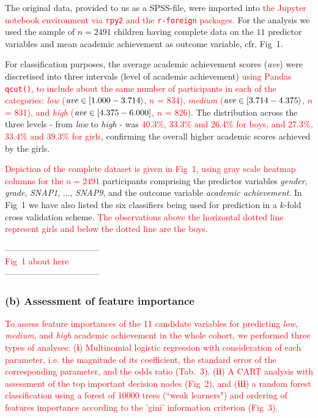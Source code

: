 \documentclass[10pt,letterpaper]{article}
\begin{document}
The original data, provided to us as a SPSS-file, were imported into \textcolor{red}{the Jupyter notebook environment via {\tt rpy2} and the {\tt r-foreign} packages.} 
For the analysis we used the sample of  $n=2491$ children having complete data 
on the $11$ predictor variables and mean academic achievement as outcome variable, cfr. Fig~1.

 For classification purposes, the average academic achievement scores (\emph{ave}) were discretised into three intervals (level of academic achievement) 
 \textcolor{red}{using Pandas {\tt qcut()}, to include about the same number of participants in each of the categories:  
{\it low} (${\text{\it ave}} \in [1.000 - 3.714\rangle$,  $n$ = 834),
{\it medium} (${\text{\it ave}} \in [3.714 - 4.375\rangle$, $n$ = 831), and
{\it high} (${\text{\it ave}} \in [4.375 - 6.000]$, $n$ = 826). }
The distribution across the three levels - from {\it low} to {\it high} - was 
\textcolor{red}{40.3\%, 33.3\% and 26.4\% for boys, and 27.3\%, 33.4\% and 39.3\% for girls}, 
confirming the overall higher academic scores achieved by the girls. 

\textcolor{red}{Depiction of the complete dataset is given in Fig~1,  using gray scale heatmap columns for the $n=2491$} participants comprising 
the predictor variables {\it gender}, {\it grade}, 
{\it SNAP1}, ..., {\it SNAP9}, and the outcome variable {\it academic achievement}. In Fig~1 we have also listed the
 six classifiers being used for prediction in a $k$-fold cross validation scheme. \textcolor{red}{The observations above the horizontal dotted line represent girls and below the dotted line are the boys.}

 \vspace{3mm}
 
 \begin{center}
 ---------------------------------\\
 
 \textcolor{red}{Fig~1 about here} \\
 
  ---------------------------------\\
  \end{center}
  
  \vspace{3mm}
  
 
 \subsubsection*{(b) Assessment of feature importance} 
  \textcolor{red}{To assess feature importances of the 11 candidate variables for predicting {\it low}, {\it medium}, and {\it high} academic achievement in the whole cohort,
 we performed three types of analyses: ({\bf i}) Multinomial logistic regression with consideration of each parameter, i.e. the magnitude of its coefficient, the standard error of the corresponding parameter, and the odds ratio (Tab.~3). 
 ({\bf ii}) A CART analysis with assessment 
 of the top important decision nodes (Fig~2), and ({\bf iii}) a random forest classification using a forest of 10000 trees (``weak learners") and ordering of features importance according
  to the 'gini' information criterion (Fig~3). }
 
\end{document}
